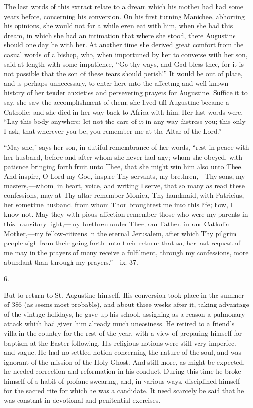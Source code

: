 The last words of this extract relate to a dream which his mother
had had some years before, concerning his conversion. On his first
turning Manichee, abhorring his opinions, she would not for a while
even eat with him, when she had this dream, in which she had an
intimation that where she stood, there Augustine should one day be
with her. At another time she derived great comfort from the casual
words of a bishop, who, when importuned by her to converse with her
son, said at length with some impatience, ``Go thy ways, and God
bless thee, for it is not possible that the son of these tears should
perish!'' It would be out of place, and is perhaps
unnecessary, to enter here into the affecting and well-known history
of her tender anxieties and persevering prayers for Augustine. Suffice
it to say, she saw the accomplishment of them; she lived till
Augustine became a Catholic; and she died in her way back to Africa
with him. Her last words were, ``Lay this body anywhere; let not
the care of it in any way distress you; this only I ask, that wherever
you be, you remember me at the Altar of the Lord.''

``May she,'' says her son, in dutiful remembrance of her
words, ``rest in peace with her husband, before and after whom she
never had any; whom she obeyed, with patience bringing forth fruit
unto Thee, that she might win him also unto Thee. And inspire, O Lord
my God, inspire Thy servants, my brethren,—Thy sons, my masters,—whom,
in heart, voice, and writing I serve, that so many as read these
confessions, may at Thy altar remember Monica, Thy handmaid, with
Patricius, her sometime husband, from whom Thou broughtest me into
this life; how, I know not. May they with pious affection remember
those who were my parents in this transitory light,—my brethren
under Thee, our Father, in our Catholic Mother,—my fellow-citizens
in the eternal Jerusalem, after which Thy pilgrim people sigh from
their going forth unto their return: that so, her last request of me
may in the prayers of many receive a fulfilment, through my
confessions, more abundant than through my prayers.''—ix. 37.

6.

But to return to St. Augustine himself. His conversion took place
in the summer of 386 (as seems most probable), and about three weeks
after it, taking advantage of the vintage holidays, he gave up his
school, assigning as a reason a pulmonary attack which had given him
already much uneasiness. He retired to a friend's villa in the country
for the rest of the year, with a view of preparing himself for baptism
at the Easter following. His religious notions were still very
imperfect and vague. He had no settled notion concerning the
nature of the soul, and was ignorant of the mission of the Holy Ghost.
And still more, as might be expected, he needed correction and
reformation in his conduct. During this time he broke himself of a
habit of profane swearing, and, in various ways, disciplined himself
for the sacred rite for which he was a candidate. It need scarcely be
said that he was constant in devotional and penitential exercises.

